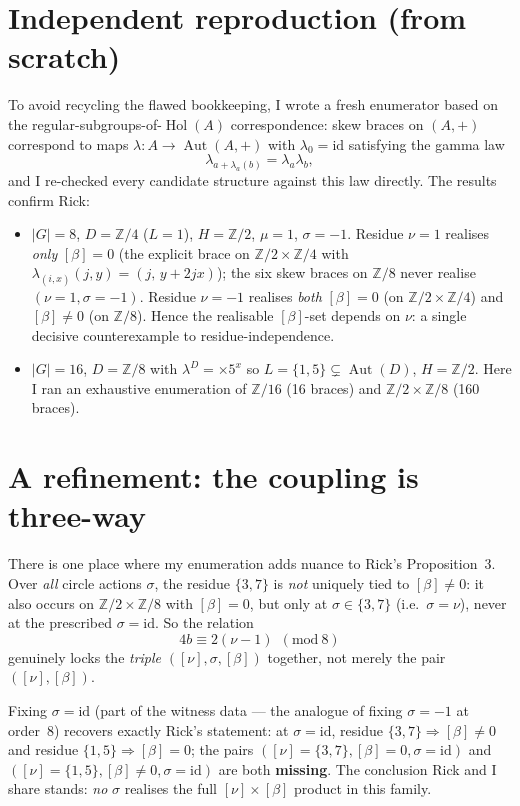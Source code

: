 \documentclass[11pt]{article}
\newcommand{\Aut}{\operatorname{Aut}}
\newcommand{\Hol}{\operatorname{Hol}}
\newcommand{\id}{\mathrm{id}}
\newcommand{\Z}{\mathbb{Z}}
\begin{document}
\section{Independent reproduction (from scratch)}

To avoid recycling the flawed bookkeeping, I wrote a fresh enumerator based on
the regular-subgroups-of-$\Hol(A)$ correspondence: skew braces on $(A,+)$
correspond to maps $\lambda:A\to\Aut(A,+)$ with $\lambda_0 = \id$ satisfying
the gamma law
\[
  \lambda_{a + \lambda_a(b)} = \lambda_a \lambda_b,
\]
and I re-checked every candidate structure against this law directly. The
results confirm Rick:

\begin{itemize}
\item $|G|=8$, $D=\Z/4$ ($L=1$), $H=\Z/2$, $\mu=1$, $\sigma=-1$. Residue
  $\nu=1$ realises \emph{only} $[\beta]=0$ (the explicit brace on
  $\Z/2\times\Z/4$ with $\lambda_{(i,x)}(j,y) = (j,\,y+2jx)$); the six skew
  braces on $\Z/8$ never realise $(\nu=1,\sigma=-1)$. Residue $\nu=-1$
  realises \emph{both} $[\beta]=0$ (on $\Z/2\times\Z/4$) and $[\beta]\neq 0$
  (on $\Z/8$). Hence the realisable $[\beta]$-set depends on $\nu$: a single
  decisive counterexample to residue-independence.
\item $|G|=16$, $D=\Z/8$ with $\lambda^D = {\times}5^{x}$ so
  $L=\{1,5\}\subsetneq\Aut(D)$, $H=\Z/2$. Here I ran an exhaustive
  enumeration of $\Z/16$ (16 braces) and $\Z/2\times\Z/8$ (160 braces).
\end{itemize}

\section{A refinement: the coupling is three-way}

There is one place where my enumeration adds nuance to Rick's Proposition~3.
Over \emph{all} circle actions $\sigma$, the residue $\{3,7\}$ is \emph{not}
uniquely tied to $[\beta]\neq 0$: it also occurs on $\Z/2\times\Z/8$ with
$[\beta]=0$, but only at $\sigma\in\{3,7\}$ (i.e.\ $\sigma=\nu$), never at the
prescribed $\sigma=\id$. So the relation
\[
  4b \equiv 2(\nu-1)\ \ (\mathrm{mod}\ 8)
\]
genuinely locks the \emph{triple} $([\nu],\sigma,[\beta])$ together, not merely
the pair $([\nu],[\beta])$.

Fixing $\sigma=\id$ (part of the witness data --- the analogue of fixing
$\sigma=-1$ at order~8) recovers exactly Rick's statement: at $\sigma=\id$,
residue $\{3,7\} \Rightarrow [\beta]\neq 0$ and residue
$\{1,5\} \Rightarrow [\beta]=0$; the pairs
$([\nu]=\{3,7\},[\beta]=0,\sigma=\id)$ and
$([\nu]=\{1,5\},[\beta]\neq 0,\sigma=\id)$ are both \textbf{missing}. The
conclusion Rick and I share stands: \emph{no} $\sigma$ realises the full
$[\nu]\times[\beta]$ product in this family.
\end{document}
